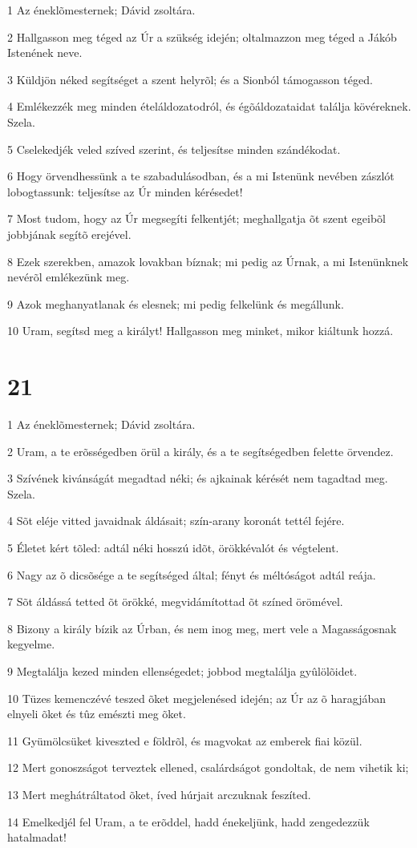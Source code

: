 \par 1 Az éneklõmesternek; Dávid zsoltára.
\par 2 Hallgasson meg téged az Úr a szükség idején; oltalmazzon meg téged a Jákób Istenének neve.
\par 3 Küldjön néked segítséget a szent helyrõl; és a Sionból támogasson téged.
\par 4 Emlékezzék meg minden ételáldozatodról, és égõáldozataidat találja kövéreknek. Szela.
\par 5 Cselekedjék veled szíved szerint, és teljesítse minden szándékodat.
\par 6 Hogy örvendhessünk a te szabadulásodban, és a mi Istenünk nevében zászlót lobogtassunk: teljesítse az Úr minden kérésedet!
\par 7 Most tudom, hogy az Úr megsegíti felkentjét; meghallgatja õt szent egeibõl jobbjának segítõ erejével.
\par 8 Ezek szerekben, amazok lovakban bíznak; mi pedig az Úrnak, a mi Istenünknek nevérõl emlékezünk meg.
\par 9 Azok meghanyatlanak és elesnek; mi pedig felkelünk és megállunk.
\par 10 Uram, segítsd meg a királyt! Hallgasson meg minket, mikor kiáltunk hozzá.

\chapter{21}

\par 1 Az éneklõmesternek; Dávid zsoltára.
\par 2 Uram, a te erõsségedben örül a király, és a te segítségedben felette örvendez.
\par 3 Szívének kivánságát megadtad néki; és ajkainak kérését nem tagadtad meg. Szela.
\par 4 Sõt eléje vitted javaidnak áldásait; szín-arany koronát tettél fejére.
\par 5 Életet kért tõled: adtál néki hosszú idõt, örökkévalót és végtelent.
\par 6 Nagy az õ dicsõsége a te segítséged által; fényt és méltóságot adtál reája.
\par 7 Sõt áldássá tetted õt örökké, megvidámítottad õt színed örömével.
\par 8 Bizony a király bízik az Úrban, és nem inog meg, mert vele a Magasságosnak kegyelme.
\par 9 Megtalálja kezed minden ellenségedet; jobbod megtalálja gyûlölõidet.
\par 10 Tüzes kemenczévé teszed õket megjelenésed idején; az Úr az õ haragjában elnyeli õket és tûz emészti meg õket.
\par 11 Gyümölcsüket kiveszted e földrõl, és magvokat az emberek fiai közül.
\par 12 Mert gonoszságot terveztek ellened, csalárdságot gondoltak, de nem vihetik ki;
\par 13 Mert meghátráltatod õket, íved húrjait arczuknak feszíted.
\par 14 Emelkedjél fel Uram, a te erõddel, hadd énekeljünk, hadd zengedezzük hatalmadat!

